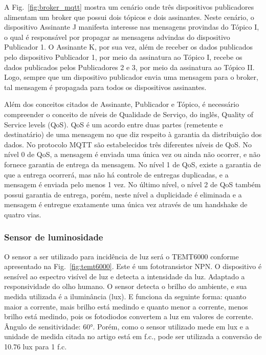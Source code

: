 \documentclass[conference]{IEEEtran}
\begin{document}
A Fig.~\ref{fig:broker_mqtt} mostra um cenário onde três dispositivos publicadores alimentam um broker que possui dois tópicos e dois assinantes. Neste cenário, o dispositivo Assinante J manifesta interesse nas mensagens provindas do Tópico I, o qual é responsável por propagar as mensagens advindas do dispositivo Publicador 1. O Assinante K, por sua vez, além de receber os dados publicados pelo dispositivo Publicador 1, por meio da assinatura ao Tópico I, recebe os dados publicados pelos Publicadores 2 e 3, por meio da assinatura ao Tópico II. Logo, sempre que um dispositivo publicador envia uma mensagem para o broker, tal mensagem é propagada para todos os dispositivos assinantes.\cite{b22}

Além dos conceitos citados de Assinante, Publicador e Tópico, é necessário compreender o conceito de níveis de Qualidade de Serviço, do inglês, Quality of Service levels (QoS). QoS é um acordo entre duas partes (remetente e destinatário) de uma mensagem no que diz respeito à garantia da distribuição dos dados. No protocolo MQTT são estabelecidos três diferentes níveis de QoS. No nível 0 de QoS, a mensagem é enviada uma única vez ou ainda não ocorrer, e não fornece garantia de entrega da mensagem. No nível 1 de QoS, existe a garantia de que a entrega ocorrerá, mas não há controle de entregas duplicadas, e a mensagem é enviada pelo menos 1 vez. No último nível, o nível 2 de QoS também possui garantia de entrega, porém, neste nível a duplicidade é eliminada e a mensagem é entregue exatamente uma única vez através de um handshake de quatro vias. \cite{b22,b23}

\subsubsection{Sensor de luminosidade}
O sensor a ser utilizado para incidência de luz será o TEMT6000 conforme apresentado na Fig.~\ref{fig:temt6000}. Este é um fototransistor NPN. O dispositivo é sensível ao espectro visível de luz e detecta a intensidade da luz. Adaptado a responsividade do olho humano. O sensor detecta o brilho do ambiente, e sua medida utilizada é a iluminância (lux). E funciona da seguinte forma: quanto maior a corrente, mais brilho está medindo e quanto menor a corrente, menos brilho está medindo, pois os fotodiodos convertem a luz em valores de corrente. Ângulo de sensitividade: 60°. \cite{b17, b18, b19} Porém, como o sensor utilizado mede em lux e a unidade de medida citada no artigo está em f.c., pode ser utilizada a conversão de 10.76 lux para 1 f.c.\cite{b20}
\end{document}

